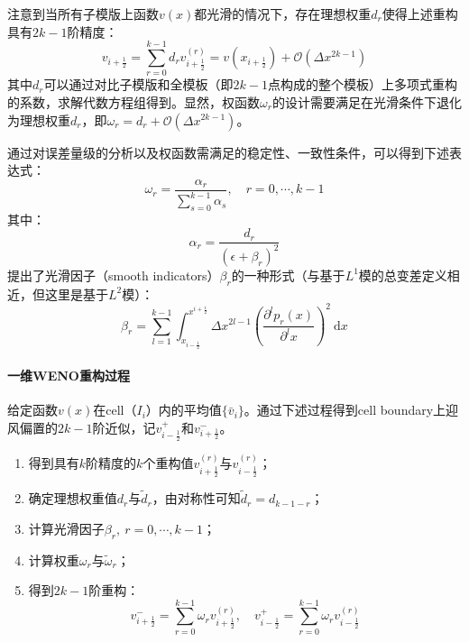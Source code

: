 \documentclass[11pt]{article}
\begin{document}
注意到当所有子模版上函数$v(x)$都光滑的情况下，存在理想权重$d_r$使得上述重构具有$2k-1$阶精度：
\begin{equation}
	v_{i+\frac{1}{2}}=\sum_{r=0}^{k-1}d_r v_{i+\frac{1}{2}}^{(r)}=v(x_{i+\frac{1}{2}})+\mathcal{O}(\Delta x^{2k-1})
\end{equation}
其中$d_r$可以通过对比子模版和全模板（即$2k-1$点构成的整个模板）上多项式重构的系数，求解代数方程组得到。显然，权函数$\omega_r$的设计需要满足在光滑条件下退化为理想权重$d_r$，即$\omega_r=d_r+\mathcal{O}(\Delta x^{2k-1})$。

通过对误差量级的分析以及权函数需满足的稳定性、一致性条件，可以得到下述表达式：
\begin{equation}
	\omega_r=\frac{\alpha_r}{\sum_{s=0}^{k-1}\alpha_s},\quad r=0,\cdots,k-1
\end{equation}
其中：
\begin{equation}
	\alpha_r=\frac{d_r}{(\epsilon+\beta_r)^2}
\end{equation}
\citet{jiang_efficient_1996}提出了光滑因子（smooth indicators）$\beta_r$的一种形式（与基于$L^1$模的总变差定义相近，但这里是基于$L^2$模）：
\begin{equation}
	\beta_r=\sum_{l=1}^{k-1}\int_{x_{i-\frac{1}{2}}}^{x^{i+\frac{1}{2}}}\Delta x^{2l-1}\left(\frac{\partial^l p_r(x)}{\partial^l x}\right)^2\ \mathrm{d}x
\end{equation}

\paragraph{一维WENO重构过程} 给定函数$v(x)$在cell（$I_i$）内的平均值$\{\bar{v}_i\}$。通过下述过程得到cell boundary上迎风偏置的$2k-1$阶近似，记$v_{i-\frac{1}{2}}^+$和$v_{i+\frac{1}{2}}^-$。
\begin{enumerate}
	\item 得到具有$k$阶精度的$k$个重构值$v_{i+\frac{1}{2}}^{(r)}$与$v_{i-\frac{1}{2}}^{(r)}$；
	\item 确定理想权重值$d_r$与$\tilde{d}_r$，由对称性可知$\tilde{d}_r=d_{k-1-r}$；
	\item 计算光滑因子$\beta_r,\ r=0,\cdots,k-1$；
	\item 计算权重$\omega_r$与$\tilde{\omega}_r$；
	\item 得到$2k-1$阶重构：
	      $$
		      v_{i+\frac{1}{2}}^-=\sum_{r=0}^{k-1}\omega_rv_{i+\frac{1}{2}}^{(r)},\quad v_{i-\frac{1}{2}}^+=\sum_{r=0}^{k-1}\omega_rv_{i-\frac{1}{2}}^{(r)}
	      $$
\end{enumerate}
\end{document}
